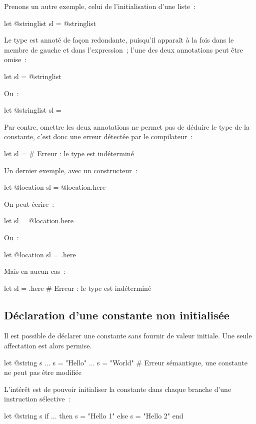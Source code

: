 Prenons un autre exemple, celui de l'initialisation d'une liste~:
\begin{galgas}
let @stringlist sl = @stringlist {}
\end{galgas}

Le type est annoté de façon redondante, puisqu'il apparaît à la fois dans le membre de gauche et dans l'expression~; l'une des deux annotations peut être omise~:
\begin{galgas}
let sl = @stringlist {}
\end{galgas}

Ou~:
\begin{galgas}
let @stringlist sl = {}
\end{galgas}

Par contre, omettre les deux annotations ne permet pas de déduire le type de la constante, c'est donc une erreur détectée par le compilateur~:
\begin{galgas}
let sl = {} # Erreur : le type est indéterminé
\end{galgas}

Un dernier exemple, avec un constructeur~:
\begin{galgas}
let @location sl = @location.here
\end{galgas}

On peut écrire~:
\begin{galgas}
let sl = @location.here
\end{galgas}

Ou~:
\begin{galgas}
let @location sl = .here
\end{galgas}

Mais en aucun cas~:
\begin{galgas}
let sl = .here # Erreur : le type est indéterminé
\end{galgas}


\subsection{Déclaration d'une constante non initialisée}

Il est possible de déclarer une constante sans fournir de valeur initiale. Une seule affectation est alors permise.

\begin{galgas}
let @string s
...
s = "Hello"
...
s = "World" # Erreur sémantique, une constante ne peut pas être modifiée
\end{galgas}

L'intérêt est de pouvoir initialiser la constante dans chaque branche d'une instruction sélective~:
\begin{galgas}
let @string s
if ... then
  s = "Hello 1"
else
  s = "Hello 2"
end
\end{galgas}












